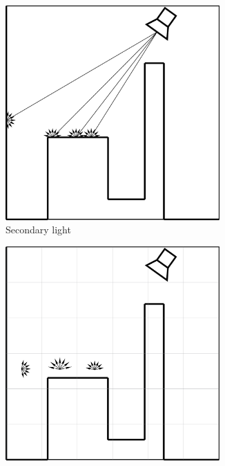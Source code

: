 \begin{figure}\label{f:lpv-basic-idea}
\begin{subfigure}[b]{0.32\textwidth}
	\includegraphics[width=0.9\textwidth]{graphics/lpv/lpv-2-1}
	\caption{Secondary light}
\end{subfigure}
\begin{subfigure}[b]{0.32\textwidth}
	\includegraphics[width=0.9\textwidth]{graphics/lpv/lpv-2-2}

\end{subfigure}
\end{figure}
